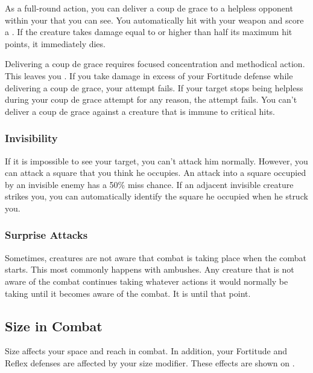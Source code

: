             \label{Coup de Grace} As a full-round action, you can deliver a coup de grace to a helpless opponent within your  that you can see.
            You automatically hit with your weapon and score a . If the creature takes damage equal to or higher than half its maximum hit points, it immediately dies.

            Delivering a coup de grace requires focused concentration and methodical action. This leaves you . If you take damage in excess of your Fortitude defense while delivering a coup de grace, your attempt fails.
            If your target stops being helpless during your coup de grace attempt for any reason, the attempt fails.
            You can't deliver a coup de grace against a creature that is immune to critical hits.

        \subsubsection{Invisibility}\label{Invisibility}
            If it is impossible to see your target, you can't attack him normally. However, you can attack a square that you think he occupies. An attack into a square occupied by an invisible enemy has a 50\% miss chance. If an adjacent invisible creature strikes you, you can automatically identify the square he occupied when he struck you.

        \subsubsection{Surprise Attacks}\label{Surprise Attacks}
            Sometimes, creatures are not aware that combat is taking place when the combat starts. This most commonly happens with ambushes. Any creature that is not aware of the combat continues taking whatever actions it would normally be taking until it becomes aware of the combat. It is \unaware until that point.

    \subsection{Size in Combat}\label{Size in Combat}
        Size affects your space and reach in combat.
        In addition, your Fortitude and Reflex defenses are affected by your size modifier.
        These effects are shown on .

